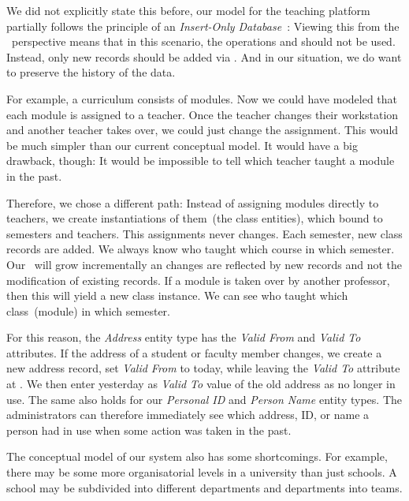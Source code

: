 We did not explicitly state this before, our model for the teaching platform partially follows the principle of an \emph{Insert-Only Database}~\cite{P2014ACIIMDMTIMOIMD:IO}:%
%
%
%
Viewing this from the \sql\ perspective means that in this scenario, the operations  and  should not be used.
Instead, only new records should be added via .
And in our situation, we do want to preserve the history of the data.

For example, a curriculum consists of modules.
Now we could have modeled that each module is assigned to a teacher.
Once the teacher changes their workstation and another teacher takes over, we could just change the assignment.
This would be much simpler than our current conceptual model.
It would have a big drawback, though:
It would be impossible to tell which teacher taught a module in the past.

Therefore, we chose a different path:
Instead of assigning modules directly to teachers, we create instantiations of them~(the class entities), which bound to semesters and teachers.
This assignments never changes.
Each semester, new class records are added.
We always know who taught which course in which semester.
Our \db\ will grow incrementally an changes are reflected by new records and not the modification of existing records.
If a module is taken over by another professor, then this will yield a new class instance.
We can see who taught which class~(module) in which semester.

For this reason, the \emph{Address} entity type has the \emph{Valid From} and \emph{Valid To} attributes.
If the address of a student or faculty member changes, we create a new address record, set \emph{Valid From} to today, while leaving the \emph{Valid To} attribute at .
We then enter yesterday as \emph{Valid To} value of the old address as no longer in use.
The same also holds for our \emph{Personal ID} and \emph{Person Name} entity types.
The administrators can therefore immediately see which address, ID, or name a person had in use when some action was taken in the past.

The conceptual model of our system also has some shortcomings.
For example, there may be some more organisatorial levels in a university than just schools.
A school may be subdivided into different departments and departments into teams.

